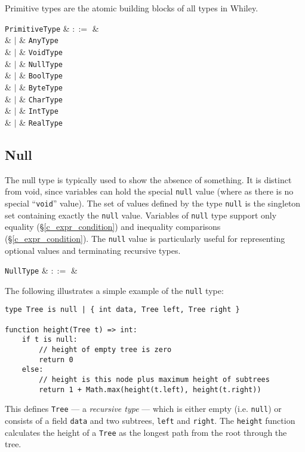 Primitive types are the atomic building blocks of all types in Whiley.  

\begin{syntax}
  \verb+PrimitiveType+ & $::=$ & \\
  & $|$ & \verb+AnyType+ \\
  & $|$ & \verb+VoidType+ \\
  & $|$ & \verb+NullType+ \\
  & $|$ & \verb+BoolType+ \\
  & $|$ & \verb+ByteType+ \\
  & $|$ & \verb+CharType+ \\
  & $|$ & \verb+IntType+ \\
  & $|$ & \verb+RealType+ \\
\end{syntax}


\subsection{Null}
\label{c_types_null}

The null type is typically used to show the absence of something. It is distinct from void, since variables can hold the special \lstinline{null} value (where as there is no special ``\lstinline{void}'' value).  The set of values defined by the type \lstinline{null} is the singleton set containing exactly the \lstinline{null} value.  Variables of \lstinline{null} type support only equality (\S\ref{c_expr_condition}) and inequality comparisons (\S\ref{c_expr_condition}).  The \lstinline{null} value is particularly useful for representing optional values and terminating recursive types.

\begin{syntax}
  \verb+NullType+ & $::=$ &  \\
\end{syntax}

\noindent The following illustrates a simple example of the \lstinline{null} type:

\begin{lstlisting}
type Tree is null | { int data, Tree left, Tree right }

function height(Tree t) => int:
    if t is null:
        // height of empty tree is zero
        return 0
    else:
        // height is this node plus maximum height of subtrees
        return 1 + Math.max(height(t.left), height(t.right))
\end{lstlisting}
This defines \lstinline{Tree} --- a {\em recursive type} --- which is either empty (i.e. \lstinline{null}) or consists of a field \lstinline{data} and two subtrees, \lstinline{left} and \lstinline{right}.  The \lstinline{height} function calculates the height of a \lstinline{Tree} as the longest path from the root through the tree.

